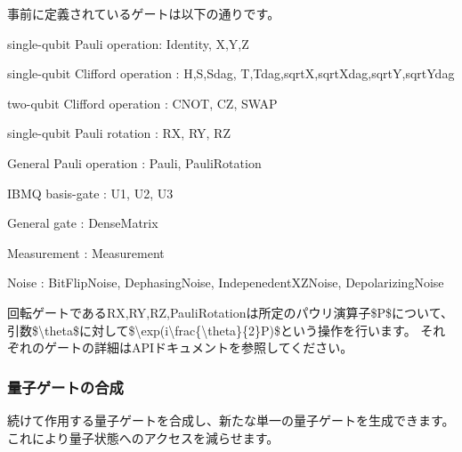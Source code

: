 事前に定義されているゲートは以下の通りです。
\begin{DoxyItemize}
\item single-\/qubit Pauli operation\+: Identity, X,Y,Z
\item single-\/qubit Clifford operation \+: H,S,Sdag, T,Tdag,sqrtX,sqrt\+Xdag,sqrtY,sqrt\+Ydag
\item two-\/qubit Clifford operation \+: C\+N\+OT, CZ, S\+W\+AP
\item single-\/qubit Pauli rotation \+: RX, RY, RZ
\item General Pauli operation \+: Pauli, Pauli\+Rotation
\item I\+B\+MQ basis-\/gate \+: U1, U2, U3
\item General gate \+: Dense\+Matrix
\item Measurement \+: Measurement
\item Noise \+: Bit\+Flip\+Noise, Dephasing\+Noise, Indepenedent\+X\+Z\+Noise, Depolarizing\+Noise
\end{DoxyItemize}

回転ゲートである{\ttfamily RX},{\ttfamily RY},{\ttfamily RZ},{\ttfamily Pauli\+Rotation}は所定のパウリ演算子\$P\$について、引数\$\textbackslash{}theta\$に対して\$\textbackslash{}exp(i\textbackslash{}frac\{\textbackslash{}theta\}\{2\}P)\$という操作を行います。 それぞれのゲートの詳細は\+A\+P\+Iドキュメントを参照してください。

\subsubsection*{量子ゲートの合成}

続けて作用する量子ゲートを合成し、新たな単一の量子ゲートを生成できます。これにより量子状態へのアクセスを減らせます。 
\begin{DoxyCode}{0}
\DoxyCodeLine{}
\DoxyCodeLine{}
\DoxyCodeLine{}
\end{DoxyCode}


